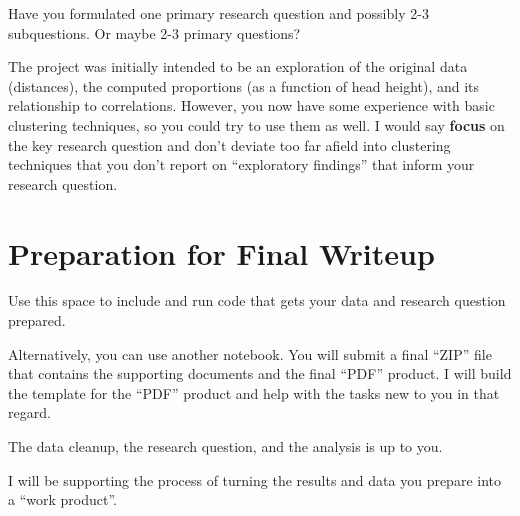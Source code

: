 \documentclass[]{article}
\begin{document}
Have you formulated one primary research question and possibly 2-3
subquestions. Or maybe 2-3 primary questions?

The project was initially intended to be an exploration of the original
data (distances), the computed proportions (as a function of head
height), and its relationship to correlations. However, you now have
some experience with basic clustering techniques, so you could try to
use them as well. I would say \textbf{focus} on the key research
question and don't deviate too far afield into clustering techniques
that you don't report on ``exploratory findings'' that inform your
research question.

\hypertarget{preparation-for-final-writeup}{%
\section{Preparation for Final
Writeup}\label{preparation-for-final-writeup}}

Use this space to include and run code that gets your data and research
question prepared.

Alternatively, you can use another notebook. You will submit a final
``ZIP'' file that contains the supporting documents and the final
``PDF'' product. I will build the template for the ``PDF'' product and
help with the tasks new to you in that regard.

The data cleanup, the research question, and the analysis is up to you.

I will be supporting the process of turning the results and data you
prepare into a ``work product''.






\newpage
\theendnotes

\newpage
\begin{auxmulticols}{}
\singlespacing 
\end{auxmulticols}

\newpage
{
\hypersetup{linkcolor=black}
\setcounter{tocdepth}{3}
\tableofcontents
}
\end{document}
